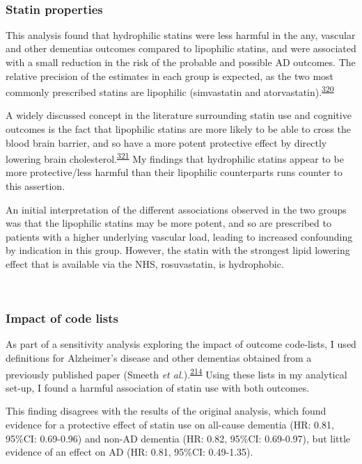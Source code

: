 \documentclass[a4paper, twoside]{templates/ociamthesis}
\begin{document}
~

\hypertarget{statin-properties-2}{%
\subsubsection{Statin properties}\label{statin-properties-2}}

This analysis found that hydrophilic statins were less harmful in the any, vascular and other dementias outcomes compared to lipophilic statins, and were associated with a small reduction in the risk of the probable and possible AD outcomes. The relative precision of the estimates in each group is expected, as the two most commonly prescribed statins are lipophilic (simvastatin and atorvastatin).\textsuperscript{\protect\hyperlink{ref-newman2019}{320}}

A widely discussed concept in the literature surrounding statin use and cognitive outcomes is the fact that lipophilic statins are more likely to be able to cross the blood brain barrier, and so have a more potent protective effect by directly lowering brain cholesterol.\textsuperscript{\protect\hyperlink{ref-shepardson2011}{321}} My findings that hydrophilic statins appear to be more protective/less harmful than their lipophilic counterparts runs counter to this assertion.

An initial interpretation of the different associations observed in the two groups was that the lipophilic statins may be more potent, and so are prescribed to patients with a higher underlying vascular load, leading to increased confounding by indication in this group. However, the statin with the strongest lipid lowering effect that is available via the NHS, rosuvastatin, is hydrophobic.

~

\hypertarget{impact-of-code-lists}{%
\subsubsection{Impact of code lists}\label{impact-of-code-lists}}

As part of a sensitivity analysis exploring the impact of outcome code-lists, I used definitions for Alzheimer's disease and other dementias obtained from a previously published paper (Smeeth \emph{et al.}).\textsuperscript{\protect\hyperlink{ref-smeeth2009}{214}} Using these lists in my analytical set-up, I found a harmful association of statin use with both outcomes.

This finding disagrees with the results of the original analysis, which found evidence for a protective effect of statin use on all-cause dementia (HR: 0.81, 95\%CI: 0.69-0.96) and non-AD dementia (HR: 0.82, 95\%CI: 0.69-0.97), but little evidence of an effect on AD (HR: 0.81, 95\%CI: 0.49-1.35).
\end{document}
